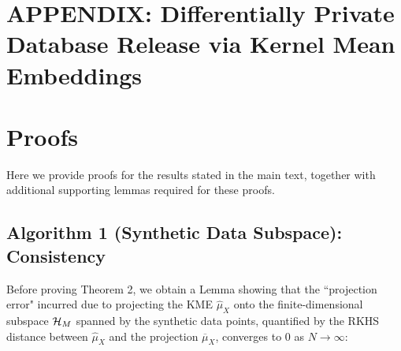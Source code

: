 \section*{APPENDIX: Differentially Private Database Release via Kernel Mean Embeddings}



\section{Proofs}
\label{sec:app:proofs}

Here we provide proofs for the results stated in the main text, together with additional supporting lemmas required for these proofs.


\subsection{Algorithm 1 (Synthetic Data Subspace): Consistency}
\label{app:sec:synthetic_subspace_consistency}

Before proving Theorem 2, we obtain a Lemma showing that the ``projection error" incurred due to projecting the KME $\hat{\mu}_X$ onto the finite-dimensional subspace $\mathcal{H}_M$ spanned by the synthetic data points, quantified by the RKHS distance between $\hat{\mu}_X$ and the projection $\overline{\mu}_X$, converges to $0$ as $N \to \infty$:


